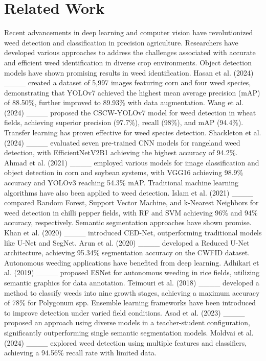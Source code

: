 \section{Related Work}
Recent advancements in deep learning and computer vision have revolutionized weed detection and classification in precision agriculture. Researchers have developed various approaches to address the challenges associated with accurate and efficient weed identification in diverse crop environments.
Object detection models have shown promising results in weed identification. Hasan et al. (2024) ____ created a dataset of 5,997 images featuring corn and four weed species, demonstrating that YOLOv7 achieved the highest mean average precision (mAP) of 88.50\%, further improved to 89.93\% with data augmentation. Wang et al. (2024) ____ proposed the CSCW-YOLOv7 model for weed detection in wheat fields, achieving superior precision (97.7\%), recall (98\%), and mAP (94.4\%).
Transfer learning has proven effective for weed species detection. Shackleton et al. (2024) ____ evaluated seven pre-trained CNN models for rangeland weed detection, with EfficientNetV2B1 achieving the highest accuracy of 94.2\%. Ahmad et al. (2021) ____ employed various models for image classification and object detection in corn and soybean systems, with VGG16 achieving 98.9\% accuracy and YOLOv3 reaching 54.3\% mAP.
Traditional machine learning algorithms have also been applied to weed detection. Islam et al. (2021) ____ compared Random Forest, Support Vector Machine, and k-Nearest Neighbors for weed detection in chilli pepper fields, with RF and SVM achieving 96\% and 94\% accuracy, respectively.
Semantic segmentation approaches have shown promise. Khan et al. (2020) ____ introduced CED-Net, outperforming traditional models like U-Net and SegNet. Arun et al. (2020) ____ developed a Reduced U-Net architecture, achieving 95.34\% segmentation accuracy on the CWFID dataset.
Autonomous weeding applications have benefited from deep learning. Adhikari et al. (2019) ____ proposed ESNet for autonomous weeding in rice fields, utilizing semantic graphics for data annotation. Teimouri et al. (2018) ____ developed a method to classify weeds into nine growth stages, achieving a maximum accuracy of 78\% for Polygonum spp.
Ensemble learning frameworks have been introduced to improve detection under varied field conditions. Asad et al. (2023) ____ proposed an approach using diverse models in a teacher-student configuration, significantly outperforming single semantic segmentation models. Moldvai et al. (2024) ____ explored weed detection using multiple features and classifiers, achieving a 94.56\% recall rate with limited data.
